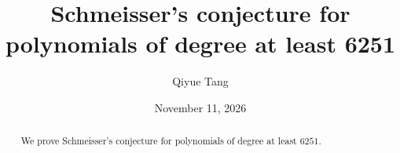 \documentclass[11pt,reqno]{amsart}
\title[Schmeisser's conjecture in degree at least 6251]{Schmeisser's conjecture for polynomials of degree at least 6251}
\author{Qiyue Tang}
\date{November 11, 2026}
\numberwithin{equation}{section}
\theoremstyle{definition}
\theoremstyle{remark}
\begin{document}
\begin{abstract}
We prove Schmeisser's conjecture for polynomials of degree at least $6251$.
\end{abstract}
\maketitle
\tableofcontents












\end{document}
